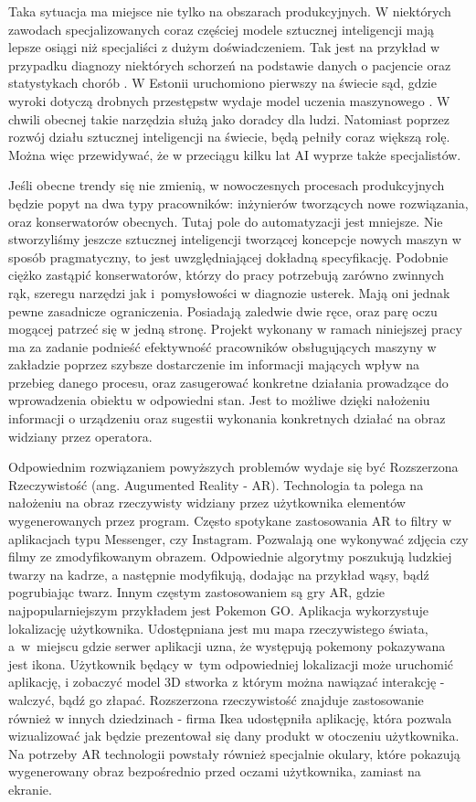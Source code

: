 \documentclass[12pt,twoside,polish]{article}
\begin{document}
Taka sytuacja ma miejsce nie tylko na obszarach produkcyjnych. W niektórych zawodach specjalizowanych coraz częściej modele sztucznej inteligencji mają lepsze osiągi niż specjaliści z dużym doświadczeniem. Tak jest na przykład w przypadku diagnozy niektórych schorzeń na podstawie danych o pacjencie oraz statystykach chorób \cite{healthcare}. W Estonii uruchomiono pierwszy na świecie sąd, gdzie wyroki dotyczą drobnych przestępstw wydaje model uczenia maszynowego \cite{judges}. W chwili obecnej takie narzędzia służą jako doradcy dla ludzi. Natomiast poprzez rozwój działu sztucznej inteligencji na świecie, będą pełniły coraz większą rolę. Można więc przewidywać, że w przeciągu kilku lat AI wyprze także specjalistów.

Jeśli obecne trendy się nie zmienią, w nowoczesnych procesach produkcyjnych będzie popyt na dwa typy pracowników: inżynierów tworzących nowe rozwiązania, oraz konserwatorów obecnych. Tutaj pole do automatyzacji jest mniejsze. Nie stworzyliśmy jeszcze sztucznej inteligencji tworzącej koncepcje nowych maszyn w sposób pragmatyczny, to jest uwzględniającej dokładną specyfikację. Podobnie ciężko zastąpić konserwatorów, którzy do pracy potrzebują zarówno zwinnych rąk, szeregu narzędzi jak i~pomysłowości w diagnozie usterek. Mają oni jednak pewne zasadnicze ograniczenia. Posiadają zaledwie dwie ręce, oraz parę oczu mogącej patrzeć się w jedną stronę. Projekt wykonany w ramach niniejszej pracy ma za zadanie podnieść efektywność pracowników obsługujących maszyny w zakładzie poprzez szybsze dostarczenie im informacji mających wpływ na przebieg danego procesu, oraz zasugerować konkretne działania prowadzące do wprowadzenia obiektu w odpowiedni stan. Jest to możliwe dzięki nałożeniu informacji o urządzeniu oraz sugestii wykonania konkretnych działać na obraz widziany przez operatora.

Odpowiednim rozwiązaniem powyższych problemów wydaje się być Rozszerzona Rzeczywistość (ang. Augumented Reality - AR). Technologia ta polega na nałożeniu na obraz rzeczywisty widziany przez użytkownika elementów wygenerowanych przez program. Często spotykane zastosowania AR to filtry w aplikacjach typu Messenger, czy Instagram. Pozwalają one wykonywać zdjęcia czy filmy ze zmodyfikowanym obrazem. Odpowiednie algorytmy poszukują ludzkiej twarzy na kadrze, a następnie modyfikują, dodając na przykład wąsy, bądź pogrubiając twarz. Innym częstym zastosowaniem są gry AR, gdzie najpopularniejszym przykładem jest Pokemon GO. Aplikacja wykorzystuje lokalizację użytkownika. Udostępniana jest mu mapa rzeczywistego świata, a~w~miejscu gdzie serwer aplikacji uzna, że występują pokemony pokazywana jest ikona. Użytkownik będący w~tym odpowiedniej lokalizacji może uruchomić aplikację, i zobaczyć model 3D stworka z którym można nawiązać interakcję - walczyć, bądź go złapać. Rozszerzona rzeczywistość znajduje zastosowanie również w innych dziedzinach - firma Ikea udostępniła aplikację, która pozwala wizualizować jak będzie prezentował się dany produkt w otoczeniu użytkownika. Na potrzeby AR technologii powstały również specjalnie okulary, które pokazują wygenerowany obraz bezpośrednio przed oczami użytkownika, zamiast na ekranie.
\end{document}
